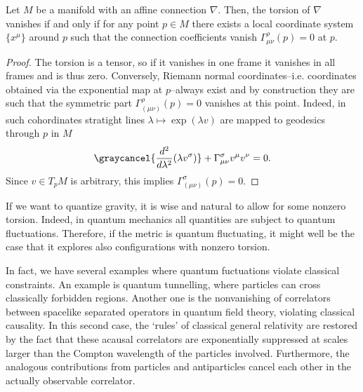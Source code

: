 \begin{theorem}
Let \(M\) be a manifold with an affine connection \(\nabla\).
Then, the torsion of \(\nabla\) vanishes if and only if for any point \(p \in M\) there exists a local coordinate system \(\{x^{\mu}\}\) around \(p\) such that the connection coefficients vanish \(\Gamma^{\rho}_{\mu \nu} (p) = 0\) at $p$.
\end{theorem}
\begin{proof}
The torsion is a tensor, so if it vanishes in one frame it vanishes in all frames and is thus zero.
Conversely, Riemann normal coordinates--i.e. coordinates obtained via the exponential map at \(p\)--always exist and by construction they are such that the symmetric part $\Gamma^{\rho}_{(\mu \nu)}(p)=0$ vanishes at this point.
Indeed, in such cohordinates stratight lines $\lambda\mapsto \exp(\lambda v)$ are mapped to geodesics through $p$ in $M$ 
\begin{equation}
    \graycancel{\frac{d^2}{d \lambda^2} (\lambda v^\sigma)}+ \Gamma^{\sigma}_{\mu \nu} v^\mu v^\nu = 0.
\end{equation}
Since $v\in T_pM$ is arbitrary, this implies $\Gamma^{\sigma}_{(\mu \nu)}(p)=0$.
\end{proof}


\begin{mytheorem}
If we want to quantize gravity, it is wise and natural to allow for some nonzero torsion.
Indeed, in quantum mechanics all quantities are subject to quantum fluctuations.
Therefore, if the metric is quantum fluctuating, it might well be the case that it explores also configurations with nonzero torsion.

In fact, we have several examples where quantum fuctuations violate classical constraints.
An example is quantum tunnelling, where  particles can cross classically forbidden regions.
Another one is the nonvanishing of correlators between spacelike separated operators in quantum field theory, violating classical causality.
In this second case, the `rules' of classical general relativity are restored by the fact that these acausal correlators are exponentially suppressed at scales larger than the Compton wavelength of the particles involved.
Furthermore, the analogous contributions from particles and antiparticles cancel each other in the actually observable correlator.
\end{mytheorem}


